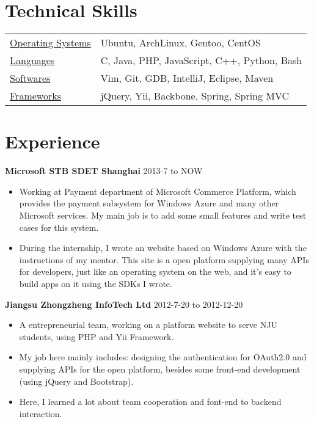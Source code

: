 \documentclass[margin]{res}
\begin{document}
 

\address{ Qichao Zhang \\ }
\address{ Nanjing University Software Institute, 2010,  Bachelor\\ (+86) 152-9838-8316  \\ \href{http://lecoding.com}{http://lecoding.com} \\ 
\href{mailto:njuzhangqichao@gmail.com}{njuzhangqichao@gmail.com} }

 
\begin{resume} 
 
\section{Technical Skills} 
   \begin{tabular}{l p{3in}}
      \underline{Operating Systems} &  Ubuntu, ArchLinux, Gentoo, CentOS \\
      \underline{Languages} &  C, Java, PHP, JavaScript, C++, Python, Bash \\
      \underline{Softwares} & Vim, Git, GDB, IntelliJ, Eclipse, Maven \\
      \underline{Frameworks} & jQuery, Yii, Backbone, Spring, Spring MVC
 \end{tabular}

\section{Experience} 
{\bf Microsoft STB SDET Shanghai} \hfill 2013-7 to NOW
\begin{itemize} \itemsep -2pt 
  \item Working at Payment department of Microsoft Commerce Platform, which provides the payment subsystem for Windows Azure and many other Microsoft services. My main job is to add some small features and write test cases for this system.
  \item During the internship, I wrote an website based on Windows Azure with the instructions of my mentor. This site is a open platform supplying many APIs for developers, just like an operating system on the web, and it's easy to build apps on it using the SDKs I wrote.
\end{itemize}

{\bf Jiangsu Zhongzheng InfoTech Ltd} \hfill 2012-7-20 to 2012-12-20 
\begin{itemize} \itemsep -2pt 
\item A entrepreneurial team, working on a platform website to serve NJU students, using PHP and Yii Framework.
\item My job here mainly includes: designing the authentication for OAuth2.0 and supplying APIs for the open platform, besides some front-end development (using jQuery and Bootstrap).
\item Here, I learned a lot about team cooperation and font-end to backend interaction.
\end{itemize}


\end{resume}
\end{document}
